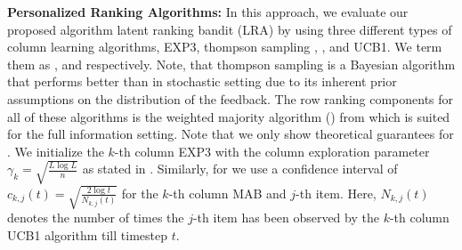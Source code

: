 \textbf{Personalized Ranking Algorithms:} In this approach, we evaluate our proposed algorithm latent ranking bandit (LRA) by using three different types of column learning algorithms, EXP3, thompson sampling  \citep{thompson1933likelihood}, \citep{thompson1935theory}, \citep{agrawal2012analysis} and UCB1. We term them as \LRAEXP, \LRATS and \LRAUCB respectively. Note, that thompson sampling is a Bayesian algorithm that performs better than \ucb in stochastic setting due to its inherent prior assumptions on the distribution of the feedback. The row ranking components for all of these algorithms is the weighted majority algorithm (\WMA) from \citet{littlestone1994weighted} which is suited for the full information setting. Note that we only show theoretical guarantees for \LRAEXP. We initialize the $k$-th column EXP3 with the column exploration parameter $\gamma_k = \sqrt{\frac{L \log L}{n}}$ as stated in \citet{auer2002nonstochastic}. Similarly, for \LRAUCB we use  a confidence interval of $c_{k, j}(t) = \sqrt{\frac{2\log t}{N_{k,j}(t)}}$  for the $k$-th column MAB and $j$-th item. Here, $N_{k, j}(t)$ denotes the number of times the $j$-th item has been observed by the $k$-th column UCB1 algorithm till timestep $t$.



%


